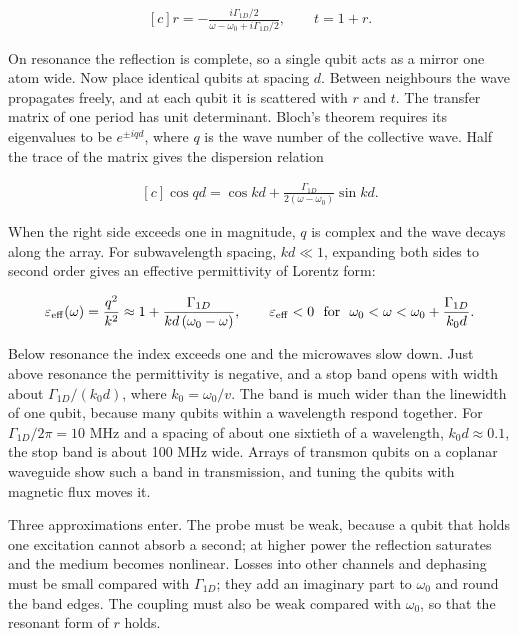 \documentclass[11pt,oneside]{book}
\newenvironment{centeredalign}{\[\begin{gathered}[c]}{\end{gathered}\]}
\begin{document}
\begin{centeredalign}
r=-\frac{i\Gamma_{1D}/2}{\omega-\omega_0+i\Gamma_{1D}/2},\qquad t=1+r.
\end{centeredalign}

On resonance the reflection is complete, so a single qubit acts as a mirror one atom wide. Now place identical qubits at spacing \(d\). Between neighbours the wave propagates freely, and at each qubit it is scattered with \(r\) and \(t\). The transfer matrix of one period has unit determinant. Bloch's theorem requires its eigenvalues to be \(e^{\pm iqd}\), where \(q\) is the wave number of the collective wave. Half the trace of the matrix gives the dispersion relation

\begin{centeredalign}
\cos qd=\cos kd+\frac{\Gamma_{1D}}{2(\omega-\omega_0)}\sin kd.
\end{centeredalign}

When the right side exceeds one in magnitude, \(q\) is complex and the wave decays along the array. For subwavelength spacing, \(kd\ll1\), expanding both sides to second order gives an effective permittivity of Lorentz form:

\begin{centeredalign}
\varepsilon_{\rm eff}(\omega)=\frac{q^2}{k^2}\approx1+\frac{\Gamma_{1D}}{kd\,(\omega_0-\omega)},
\qquad \varepsilon_{\rm eff}<0\ \text{ for }\ \omega_0<\omega<\omega_0+\frac{\Gamma_{1D}}{k_0d}.
\end{centeredalign}

Below resonance the index exceeds one and the microwaves slow down. Just above resonance the permittivity is negative, and a stop band opens with width about \(\Gamma_{1D}/(k_0d)\), where \(k_0=\omega_0/v\). The band is much wider than the linewidth of one qubit, because many qubits within a wavelength respond together. For \(\Gamma_{1D}/2\pi=10\) MHz and a spacing of about one sixtieth of a wavelength, \(k_0d\approx0.1\), the stop band is about 100 MHz wide. Arrays of transmon qubits on a coplanar waveguide show such a band in transmission, and tuning the qubits with magnetic flux moves it.

Three approximations enter. The probe must be weak, because a qubit that holds one excitation cannot absorb a second; at higher power the reflection saturates and the medium becomes nonlinear. Losses into other channels and dephasing must be small compared with \(\Gamma_{1D}\); they add an imaginary part to \(\omega_0\) and round the band edges. The coupling must also be weak compared with \(\omega_0\), so that the resonant form of \(r\) holds.
\end{document}
